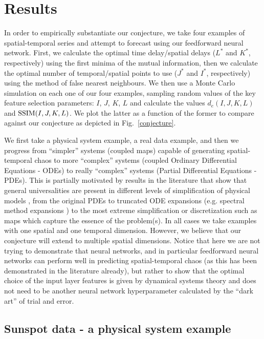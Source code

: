 \documentclass[journal]{IEEEtran}
\begin{document}

\section{Results}
\label{resultssection}

In order to empirically substantiate our conjecture, we take four examples of spatial-temporal series and attempt
to forecast using our feedforward neural network. 
First, we calculate the optimal time delay/spatial delays ($L^*$ and $K^*$, respectively)
using the first minima of the mutual information, then we calculate the optimal number of temporal/spatial points to use
($J^*$ and $I^*$, respectively) using the method of false nearest neighbours.
We then use a Monte Carlo simulation on each one of our four examples, sampling random values
of the key feature selection parameters: $I$, $J$, $K$, $L$ and calculate the values $d_e(I,J,K,L)$ and $\textnormal{SSIM}(I,J,K,L)$.
We plot the latter as a function of the former to compare against our conjecture as depicted in Fig.\ \ref{conjecture}.

We first take a physical system example, a real data example, and then we progress from ``simpler'' systems (coupled maps) 
capable of generating 
spatial-temporal chaos to more ``complex'' systems (coupled Ordinary Differential Equations - ODEs) to really ``complex'' systems (Partial 
Differential Equations - PDEs). This is partially motivated by results in the literature that show that general universalities are 
present in different levels of simplification of physical models \cite{2001Chaos..11..404C}, 
from the original PDEs to truncated ODE expansions (e.g. spectral 
method expansions \cite{2001cfsm.book.....B}) to the most extreme simplification or discretization such as maps 
which capture the essence of the problem(s). In all cases we take examples with one spatial and one temporal dimension. 
However, we believe 
that our conjecture will extend to multiple spatial dimensions. Notice that here we are not trying to demonstrate
that neural networks, and in particular feedforward neural networks can perform well in predicting spatial-temporal chaos
(as this has been demonstrated in the literature already), but 
rather to show that the optimal choice of the input layer features is given by dynamical systems theory and does not need to be
another neural network hyperparameter calculated by the ``dark art'' of trial and error.

\subsection{Sunspot data - a physical system example}
\end{document}

